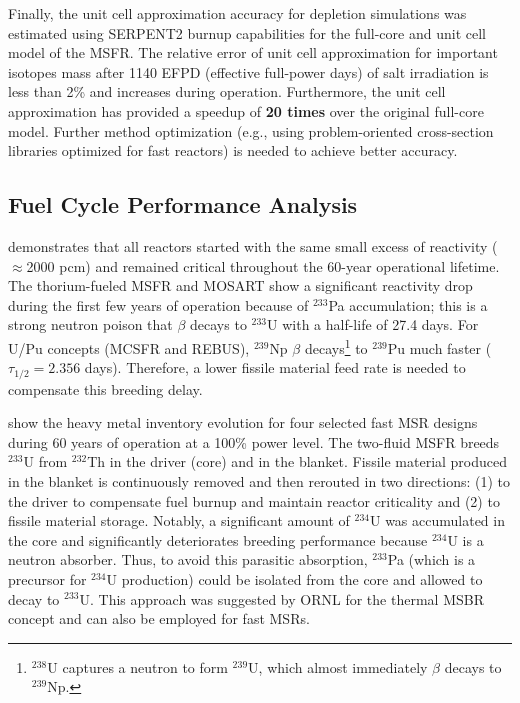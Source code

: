 \documentclass[letterpaper]{mandc2019}
\begin{document}
Finally, the unit cell approximation accuracy for depletion simulations was estimated using SERPENT2 burnup capabilities for the full-core and unit cell model of the \gls{MSFR}. 
The relative error of unit cell approximation for important isotopes mass after 1140 EFPD (effective full-power days) of salt irradiation is less than 2\% and increases during operation. 
Furthermore, the unit cell approximation has provided a speedup of \textbf{20 times} over the original full-core model.
Further method optimization (e.g., using problem-oriented cross-section libraries optimized for fast reactors) is needed to achieve better accuracy.

\subsection{Fuel Cycle Performance Analysis}
\label{sec:performance}
 demonstrates that all reactors started with the same small excess of reactivity ($\approx$2000 pcm) and remained critical throughout the 60-year operational lifetime. 
The thorium-fueled \gls{MSFR} and \gls{MOSART} show a significant reactivity drop during the first few years of operation because of $^{233}$Pa accumulation; this is a strong neutron poison that $\beta$ decays to $^{233}$U with a half-life of 27.4 days. 
For U/Pu concepts (\gls{MCSFR} and REBUS), $^{239}$Np $\beta$ decays\footnote{$^{238}$U captures a neutron to form $^{239}$U, which almost immediately $\beta$ decays to $^{239}$Np.} to $^{239}$Pu much faster ($\tau_{1/2}=2.356$ days). 
Therefore, a lower fissile material feed rate is needed to compensate this breeding delay.

 show the heavy metal inventory evolution for four selected fast \gls{MSR} designs during 60 years of operation at a 100\% power level. 
The two-fluid \gls{MSFR} breeds $^{233}$U from $^{232}$Th in the driver (core) and in the blanket. Fissile material produced in the blanket is continuously removed and then rerouted in two directions: (1) to the driver to compensate fuel burnup and maintain reactor criticality and (2) to fissile material storage. 
Notably, a significant amount of $^{234}$U was accumulated in the core and significantly deteriorates breeding performance because $^{234}$U is a neutron absorber. 
Thus, to avoid this parasitic absorption, $^{233}$Pa (which is a precursor for $^{234}$U production) could be isolated from the core and allowed to decay to $^{233}$U. 
This approach was suggested by \gls{ORNL} for the thermal \gls{MSBR} concept \cite{robertson_conceptual_1971} and can also be employed for fast \gls{MSR}s.
\end{document}
